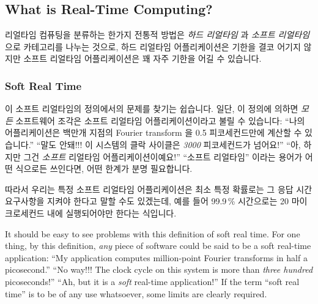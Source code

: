 \fi

\subsection{What is Real-Time Computing?}
\label{sec:advsync:What is Real-Time Computing?}

리얼타임 컴퓨팅을 분류하는 한가지 전통적 방법은 \emph{하드 리얼타임} 과
\emph{소프트 리얼타임} 으로 카테고리를 나누는 것으로, 하드 리얼타임
어플리케이션은 기한을 결코 어기지 않지만 소프트 리얼타임 어플리케이션은 꽤 자주
기한을 어길 수 있습니다.

\subsubsection{Soft Real Time}
\label{sec:Soft Real Time}

이 소프트 리얼타임의 정의에서의 문제를 찾기는 쉽습니다.
일단, 이 정의에 의하면 \emph{모든} 소프트웨어 조각은 소프트 리얼타임
어플리케이션이라고 불릴 수 있습니다:
``나의 어플리케이션은 백만개 지점의 Fourier transform 을 0.5 피코세컨드만에
계산할 수 있습니다.''
``말도 안돼!!!
이 시스템의 클락 사이클은 \emph{3000} 피코세컨드가 넘어요!''
``아, 하지만 그건 \emph{소프트} 리얼타임 어플리케이션이예요!''
``소프트 리얼타임'' 이라는 용어가 어떤 식으로든 쓰인다면, 어떤 한계가 분명
필요합니다.

따라서 우리는 특정 소프트 리얼타임 어플리케이션은 최소 특정 확률로는 그 응답
시간 요구사항을 지켜야 한다고 말할 수도 있겠는데, 예를 들어 99.9\,\% 시간으로는
20 마이크로세컨드 내에 실행되어야만 한다는 식입니다.

\iffalse

It should be easy to see problems with this definition of soft real time.
For one thing, by this definition, \emph{any} piece of software could be
said to be a soft real-time application:
``My application computes million-point Fourier transforms in half a
picosecond.''
``No way!!!
The clock cycle on this system is more than \emph{three hundred} picoseconds!''
``Ah, but it is a \emph{soft} real-time application!''
If the term ``soft real time'' is to be of any use whatsoever, some limits
are clearly required.

